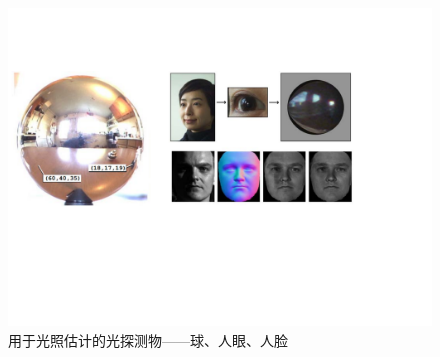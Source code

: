 \begin{figure}[!htbp]
    \centering
    \includegraphics[width=1.0\textwidth]{Img/light-probe.pdf}

    \caption[几种用于光照估计的光探测物]
    {用于光照估计的光探测物——球\cite{debevec1998rendering}、人眼\cite{nishino2004eyes}、人脸\cite{wang2007face}}
        
    \label{fig:light-probe}
\end{figure}